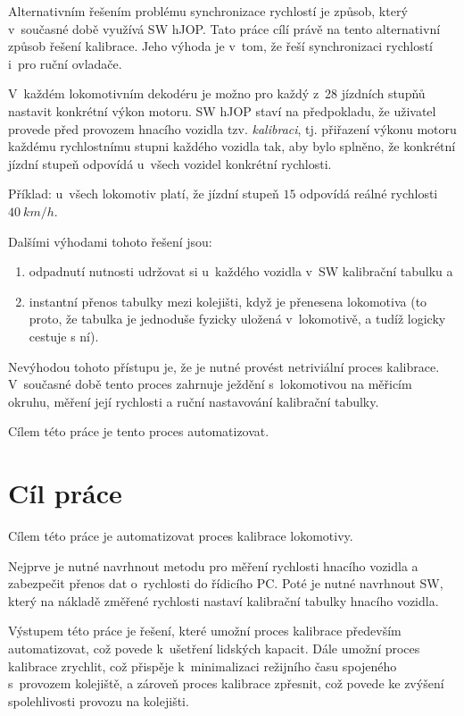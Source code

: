 Alternativním řešením problému synchronizace rychlostí je způsob, který
v~současné době využívá SW hJOP. Tato práce cílí právě na tento alternativní
způsob řešení kalibrace. Jeho výhoda je v~tom, že řeší synchronizaci
rychlostí i~pro ruční ovladače.

V~každém lokomotivním dekodéru je možno pro každý z~28 jízdních stupňů nastavit
konkrétní výkon motoru. SW hJOP staví na předpokladu, že uživatel provede před
provozem hnacího vozidla tzv. \textit{kalibraci}, tj. přiřazení výkonu motoru
každému rychlostnímu stupni každého vozidla tak, aby bylo splněno, že konkrétní
jízdní stupeň odpovídá u~všech vozidel konkrétní rychlosti.

Příklad: u~všech lokomotiv platí, že jízdní stupeň $15$ odpovídá reálné
rychlosti $40\ km/h$.

Dalšími výhodami tohoto řešení jsou:

\begin{enumerate}
	\item odpadnutí nutnosti udržovat si u~každého vozidla v~SW kalibrační
	tabulku a
	\item instantní přenos tabulky mezi kolejišti, když je přenesena
	lokomotiva (to proto, že tabulka je jednoduše fyzicky uložená v~lokomotivě,
	a tudíž logicky cestuje s ní).
\end{enumerate}

Nevýhodou tohoto přístupu je, že je nutné provést netriviální proces kalibrace.
V~současné době tento proces zahrnuje ježdění s~lokomotivou na měřicím okruhu,
měření její rychlosti a ruční nastavování kalibrační tabulky.

Cílem této práce je tento proces automatizovat.

\section{Cíl práce}

Cílem této práce je automatizovat proces kalibrace lokomotivy.

Nejprve je nutné navrhnout metodu pro měření rychlosti hnacího vozidla a
zabezpečit přenos dat o~rychlosti do řídicího PC. Poté je nutné navrhnout SW,
který na nákladě změřené rychlosti nastaví kalibrační tabulky hnacího vozidla.

Výstupem této práce je řešení, které umožní proces kalibrace především
automatizovat, což povede k~ušetření lidských kapacit. Dále umožní proces
kalibrace zrychlit, což přispěje k~minimalizaci režijního času spojeného
s~provozem kolejiště, a zároveň proces kalibrace zpřesnit, což povede ke
zvýšení spolehlivosti provozu na kolejišti.
